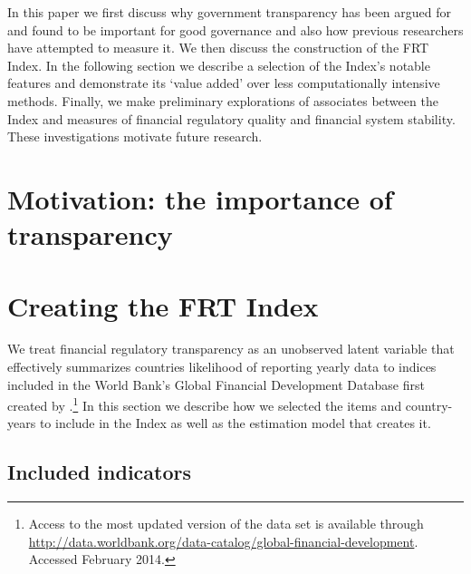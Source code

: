\documentclass[a4paper]{article}
\begin{document}
In this paper we first discuss why government transparency has been argued for and found to be important for good governance and also how previous researchers have attempted to measure it. We then discuss the construction of the FRT Index. In the following section we describe a selection of the Index's notable features and demonstrate its `value added' over less computationally intensive methods. Finally, we make preliminary explorations of associates between the Index and measures of financial regulatory quality and financial system stability. These investigations motivate future research.  

\section{Motivation: the importance of transparency}


\section{Creating the FRT Index}

We treat financial regulatory transparency as an unobserved latent variable that effectively summarizes countries likelihood of reporting yearly data to indices included in the World Bank's Global Financial Development Database first created by \cite{Cihak2012}.\footnote{Access to the most updated version of the data set is available through \url{http://data.worldbank.org/data-catalog/global-financial-development}. Accessed February 2014.} In this section we describe how we selected the items and country-years to include in the Index as well as the estimation model that creates it.

\subsection{Included indicators}
\end{document}
